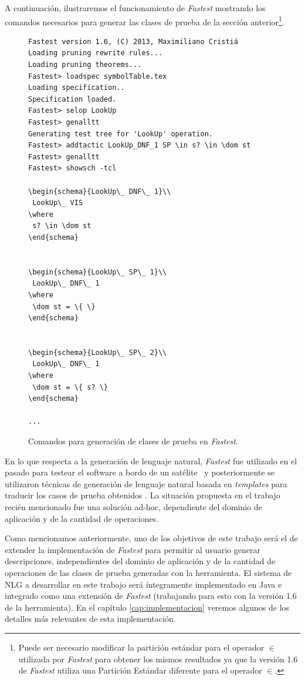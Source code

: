 A continuación, ilustraremos el funcionamiento de \emph{Fastest} mostrando los comandos necesarios para generar las clases de prueba de la sección anterior\footnote{Puede ser necesario modificar la partición estándar para el operador $\in$ utilizada por \emph{Fastest} para obtener los mismos resultados ya que la versión 1.6 de \emph{Fastest} utiliza una Partición Estándar diferente para el operador $\in$.}.


\begin{figure}[H]
\begin{Verbatim}[frame=single,fontsize=\scriptsize]
Fastest version 1.6, (C) 2013, Maximiliano Cristiá
Loading pruning rewrite rules...
Loading pruning theorems...
Fastest> loadspec symbolTable.tex
Loading specification..
Specification loaded.
Fastest> selop LookUp
Fastest> genalltt 
Generating test tree for 'LookUp' operation.
Fastest> addtactic LookUp_DNF_1 SP \in s? \in \dom st
Fastest> genalltt                                    
Fastest> showsch -tcl

\begin{schema}{LookUp\_ DNF\_ 1}\\
 LookUp\_ VIS 
\where
 s? \in \dom st
\end{schema}


\begin{schema}{LookUp\_ SP\_ 1}\\
 LookUp\_ DNF\_ 1 
\where
 \dom st = \{ \}
\end{schema}


\begin{schema}{LookUp\_ SP\_ 2}\\
 LookUp\_ DNF\_ 1 
\where
 \dom st = \{ s? \}
\end{schema}

...
\end{Verbatim}
\caption{Comandos para generación de clases de prueba en \emph{Fastest}.}
\label{ej:comandos_fastest}
\end{figure}


En lo que respecta a la generación de lenguaje natural, \emph{Fastest} fue utilizado en el pasado para testear el software a bordo de un satélite~\cite{satelite} y posteriormente se utilizaron técnicas de generación de lenguaje natural basada en \textit{templates} para traducir los casos de prueba obtenidos \cite{cristia_pluss}. La situación propuesta en el trabajo recién mencionado fue una solución ad-hoc, dependiente del dominio de aplicación y de la cantidad de operaciones.


Como mencionamos anteriormente, uno de los objetivos de este trabajo será el de extender la implementación de \emph{Fastest} para permitir al usuario generar descripciones, independientes del dominio de aplicación y de la cantidad de operaciones de las clases de prueba generadas con la herramienta.
El sistema de NLG a desarrollar en este trabajo será íntegramente implementado en Java e integrado como una extensión de \emph{Fastest} (trabajando para esto con la versión 1.6 de la herramienta). En el capítulo \ref{cap:implementacion} veremos algunos de los detalles más relevantes de esta implementación.

